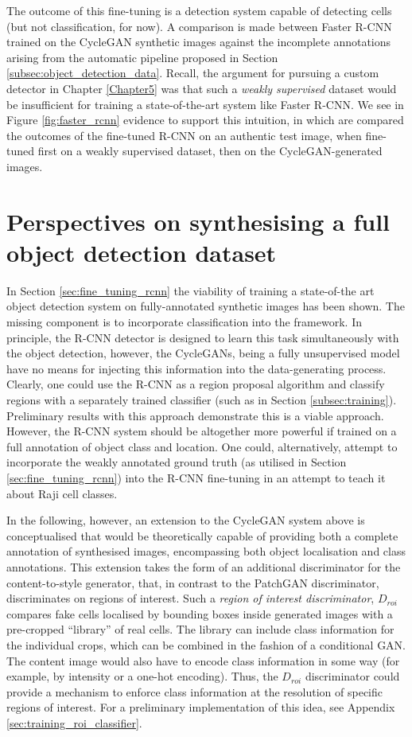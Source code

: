 The outcome of this fine-tuning is a detection system capable of detecting cells (but not classification, for now). A comparison is made between Faster R-CNN trained on the CycleGAN synthetic images against the incomplete annotations arising from the automatic pipeline proposed in Section \ref{subsec:object_detection_data}. Recall, the argument for pursuing a custom detector in Chapter \ref{Chapter5} was that such a \emph{weakly supervised} dataset would be insufficient for training a state-of-the-art system like Faster R-CNN. We see in Figure \ref{fig:faster_rcnn} evidence to support this intuition, in which are compared the outcomes of the fine-tuned R-CNN on an authentic test image, when fine-tuned first on a weakly supervised dataset, then on the CycleGAN-generated images.

\section{Perspectives on synthesising a full object detection dataset}
\label{sec:full_object_detection_dataset}
In Section \ref{sec:fine_tuning_rcnn} the viability of training a state-of-the art object detection system on fully-annotated synthetic images has been shown. The missing component is to incorporate classification into the framework. In principle, the R-CNN detector is designed to learn this task simultaneously with the object detection, however, the CycleGANs, being a fully unsupervised model have no means for injecting this information into the data-generating process. Clearly, one could use the R-CNN as a region proposal algorithm and classify regions with a separately trained classifier (such as in Section \ref{subsec:training}). Preliminary results with this approach demonstrate this is a viable approach. However, the R-CNN system should be altogether more powerful if trained on a full annotation of object class and location. One could, alternatively, attempt to incorporate the weakly annotated ground truth (as utilised in Section \ref{sec:fine_tuning_rcnn}) into the R-CNN fine-tuning in an attempt to teach it about Raji cell classes.

In the following, however, an extension to the CycleGAN system above is conceptualised that would be theoretically capable of providing both a complete annotation of synthesised images, encompassing both object localisation and class annotations. This extension takes the form of an additional discriminator for the content-to-style generator, that, in contrast to the PatchGAN discriminator, discriminates on regions of interest. Such a \emph{region of interest discriminator}, $D_{roi}$ compares fake cells localised by bounding boxes inside generated images with a pre-cropped ``library'' of real cells. The library can include class information for the individual crops, which can be combined in the fashion of a conditional GAN. The content image would also have to encode class information in some way (for example, by intensity or a one-hot encoding). Thus, the $D_{roi}$ discriminator could provide a mechanism to enforce class information at the resolution of specific regions of interest. For a preliminary implementation of this idea, see Appendix \ref{sec:training_roi_classifier}.


